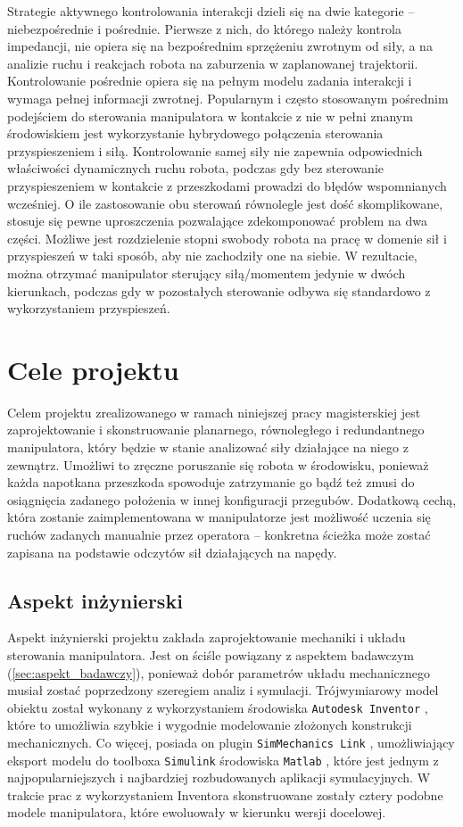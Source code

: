 \documentclass[printmode]{mgr}
\begin{document}
Strategie aktywnego kontrolowania interakcji dzieli się na dwie kategorie -- niebezpośrednie i pośrednie.
Pierwsze z nich, do którego należy kontrola impedancji, nie opiera się na bezpośrednim sprzężeniu zwrotnym od siły, a na analizie ruchu
i reakcjach robota na zaburzenia w zaplanowanej trajektorii. Kontrolowanie pośrednie opiera się na pełnym modelu zadania interakcji
i wymaga pełnej informacji zwrotnej. Popularnym i często stosowanym pośrednim podejściem do sterowania manipulatora w kontakcie z nie w 
pełni znanym środowiskiem jest wykorzystanie hybrydowego połączenia sterowania przyspieszeniem i siłą. 
Kontrolowanie samej siły nie zapewnia odpowiednich właściwości dynamicznych ruchu
robota, podczas gdy bez sterowanie przyspieszeniem w kontakcie z przeszkodami prowadzi do błędów wspomnianych wcześniej. 
O ile zastosowanie obu sterowań równolegle jest dość skomplikowane, stosuje się pewne uproszczenia pozwalające zdekomponować
problem na dwa części. Możliwe jest rozdzielenie stopni swobody robota na pracę w domenie sił i przyspieszeń w taki sposób,
aby nie zachodziły one na siebie. W rezultacie, można otrzymać manipulator sterujący siłą/momentem jedynie w dwóch kierunkach,
podczas gdy w pozostałych sterowanie odbywa się standardowo z wykorzystaniem przyspieszeń.


\chapter{Cele projektu} \label{ch:cele}
Celem projektu zrealizowanego w ramach niniejszej pracy magisterskiej jest zaprojektowanie i skonstruowanie planarnego, równoległego
i redundantnego manipulatora, który będzie w stanie analizować siły działające na niego z zewnątrz. Umożliwi to 
zręczne poruszanie się robota w środowisku, ponieważ każda napotkana przeszkoda spowoduje zatrzymanie go bądź też zmusi
do osiągnięcia zadanego położenia w innej konfiguracji przegubów. Dodatkową cechą, która zostanie zaimplementowana w manipulatorze
jest możliwość uczenia się ruchów zadanych manualnie przez operatora -- konkretna ścieżka może zostać zapisana na podstawie
odczytów sił działających na napędy. 

\section{Aspekt inżynierski}
Aspekt inżynierski projektu zakłada zaprojektowanie mechaniki i układu sterowania manipulatora. Jest on ściśle powiązany
z aspektem badawczym (\ref{sec:aspekt_badawczy}), ponieważ dobór parametrów układu mechanicznego musiał zostać poprzedzony
szeregiem analiz i symulacji. Trójwymiarowy model obiektu został wykonany z wykorzystaniem środowiska \texttt{Autodesk Inventor} \cite{autodesk},
które to umożliwia szybkie i wygodnie modelowanie złożonych konstrukcji mechanicznych. Co więcej, posiada on plugin
\texttt{SimMechanics Link} \cite{simmechanics_link}, umożliwiający eksport modelu do toolboxa \texttt{Simulink} środowiska 
\texttt{Matlab} \cite{mathworks}, które jest jednym z najpopularniejszych i najbardziej rozbudowanych aplikacji symulacyjnych.
W trakcie prac z wykorzystaniem Inventora skonstruowane zostały cztery podobne modele manipulatora, które ewoluowały 
w kierunku wersji docelowej. 
\end{document}
